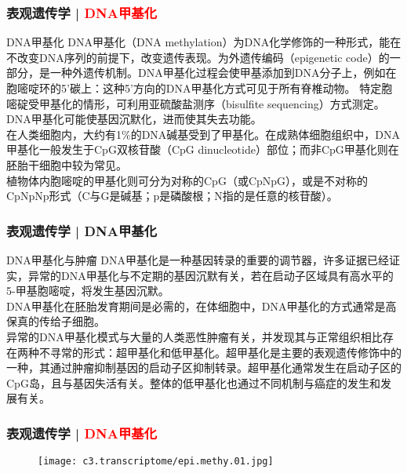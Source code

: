 \begin{frame}
  \frametitle{表观遗传学 | \textcolor{red}{DNA甲基化}}
  \begin{block}{DNA甲基化}
    DNA甲基化（DNA methylation）为DNA化学修饰的一种形式，能在不改变DNA序列的前提下，改变遗传表现。为外遗传编码（epigenetic code）的一部分，是一种外遗传机制。DNA甲基化过程会使甲基添加到DNA分子上，例如在胞嘧啶环的5'碳上：这种5'方向的DNA甲基化方式可见于所有脊椎动物。 特定胞嘧碇受甲基化的情形，可利用亚硫酸盐测序（bisulfite sequencing）方式测定。DNA甲基化可能使基因沉默化，进而使其失去功能。\\
    \vspace{0.5em}
    在人类细胞内，大约有1\%的DNA碱基受到了甲基化。在成熟体细胞组织中，DNA甲基化一般发生于CpG双核苷酸（CpG dinucleotide）部位；而非CpG甲基化则在胚胎干细胞中较为常见。\\
    \vspace{0.5em}
    植物体内胞嘧啶的甲基化则可分为对称的CpG（或CpNpG），或是不对称的CpNpNp形式（C与G是碱基；p是磷酸根；N指的是任意的核苷酸）。
  \end{block}
\end{frame}

\begin{frame}
  \frametitle{表观遗传学 | DNA甲基化}
  \begin{block}{DNA甲基化与肿瘤}
 DNA甲基化是一种基因转录的重要的调节器，许多证据已经证实，异常的DNA甲基化与不定期的基因沉默有关，若在启动子区域具有高水平的5-甲基胞嘧啶，将发生基因沉默。\\
 \vspace{0.5em}
DNA甲基化在胚胎发育期间是必需的，在体细胞中，DNA甲基化的方式通常是高保真的传给子细胞。\\
 \vspace{0.5em}
异常的DNA甲基化模式与大量的人类恶性肿瘤有关，并发现其与正常组织相比存在两种不寻常的形式：超甲基化和低甲基化。超甲基化是主要的表观遗传修饰中的一种，其通过肿瘤抑制基因的启动子区抑制转录。超甲基化通常发生在启动子区的CpG岛，且与基因失活有关。整体的低甲基化也通过不同机制与癌症的发生和发展有关。 
  \end{block}
\end{frame}

\begin{frame}
  \frametitle{表观遗传学 | \textcolor{red}{DNA甲基化}}
  \begin{figure}
    \centering
    \texttt{[image: c3.transcriptome/epi.methy.01.jpg]}
  \end{figure}
\end{frame}

